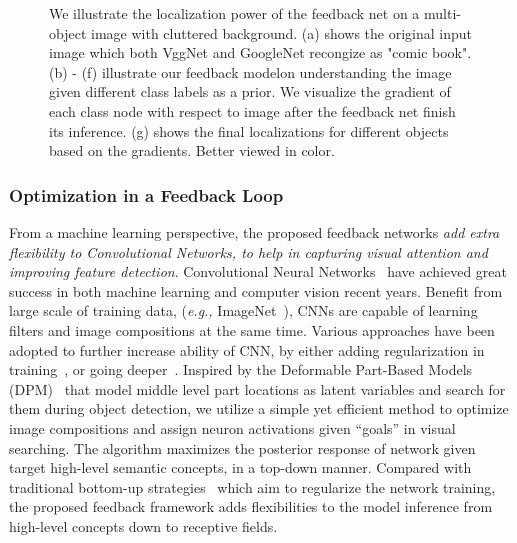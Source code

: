 \begin{figure}[htb]
\begin{center}
\begin{tabular}{ccccccc}
\end{tabular}
\caption{We illustrate the localization power of the feedback net on a multi-object image with cluttered background. (a) shows the original input image which both VggNet and GoogleNet recongize as "comic book". (b) - (f) illustrate our feedback modelon understanding the image given different class labels as a prior. We visualize the gradient of each class node with respect to image after the feedback net finish its inference. (g) shows the final localizations for different objects based on the gradients. Better viewed in color.}
\label{fig:splah}
\end{center}
\end{figure}

\subsubsection{Optimization in a Feedback Loop}
From a machine learning perspective, the proposed feedback networks \emph{add extra flexibility to Convolutional Networks, to help in capturing visual attention and improving feature detection}. Convolutional Neural Networks~\cite{lecun1998gradient, Krizhevsky2012ImageNet, Simonyan2014Very} have achieved great success in both machine learning and computer vision recent years. Benefit from large scale of training data, (\emph{e.g.,} ImageNet~\cite{deng2009imagenet}), CNNs are capable of learning filters and image compositions at the same time. Various approaches have been adopted to further increase ability of CNN, by either adding regularization in training~\cite{he2015delving,ioffe2015batch}, or going deeper~\cite{Simonyan2014Very, Szegedy2014Going}. Inspired by the Deformable Part-Based Models (DPM)~\cite{Felzenszwalb2010Object} that model middle level part locations as latent variables and search for them during object detection, we utilize a simple yet efficient method to optimize image compositions and assign neuron activations given ``goals'' in visual searching. The algorithm maximizes the posterior response of network given target high-level semantic concepts, in a top-down manner. Compared with traditional bottom-up strategies~\cite{he2015delving, ioffe2015batch} which aim to regularize the network training, the proposed feedback framework adds flexibilities to the model inference from high-level concepts down to receptive fields.

